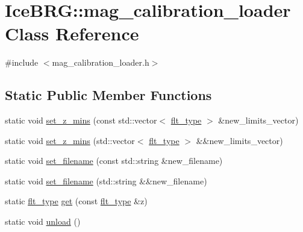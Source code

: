 \hypertarget{classIceBRG_1_1mag__calibration__loader}{\section{Ice\-B\-R\-G\-:\-:mag\-\_\-calibration\-\_\-loader Class Reference}
\label{classIceBRG_1_1mag__calibration__loader}
}


{\ttfamily \#include $<$mag\-\_\-calibration\-\_\-loader.\-h$>$}

\subsection*{Static Public Member Functions}
\begin{DoxyCompactItemize}
\item 
static void \hyperlink{classIceBRG_1_1mag__calibration__loader_af276f91edf2a3a40189983c705092c37}{set\-\_\-z\-\_\-mins} (const std\-::vector$<$ \hyperlink{lib_2IceBRG__main_2common_8h_ad0f130a56eeb944d9ef2692ee881ecc4}{flt\-\_\-type} $>$ \&new\-\_\-limits\-\_\-vector)
\item 
static void \hyperlink{classIceBRG_1_1mag__calibration__loader_ace15d6820dfc88c0501c0b1a8cfdd32f}{set\-\_\-z\-\_\-mins} (std\-::vector$<$ \hyperlink{lib_2IceBRG__main_2common_8h_ad0f130a56eeb944d9ef2692ee881ecc4}{flt\-\_\-type} $>$ \&\&new\-\_\-limits\-\_\-vector)
\item 
static void \hyperlink{classIceBRG_1_1mag__calibration__loader_a6d8f09bdfb5a75ed3d25370bda3ca545}{set\-\_\-filename} (const std\-::string \&new\-\_\-filename)
\item 
static void \hyperlink{classIceBRG_1_1mag__calibration__loader_ad79c4c5eb6ccab5d2212bfe77633e03a}{set\-\_\-filename} (std\-::string \&\&new\-\_\-filename)
\item 
static \hyperlink{lib_2IceBRG__main_2common_8h_ad0f130a56eeb944d9ef2692ee881ecc4}{flt\-\_\-type} \hyperlink{classIceBRG_1_1mag__calibration__loader_a2e1d2ff7d05458a304ceb7f993448aa7}{get} (const \hyperlink{lib_2IceBRG__main_2common_8h_ad0f130a56eeb944d9ef2692ee881ecc4}{flt\-\_\-type} \&z)
\item 
static void \hyperlink{classIceBRG_1_1mag__calibration__loader_a71a4df8564cc427b21b3583ebd58b15d}{unload} ()
\end{DoxyCompactItemize}


